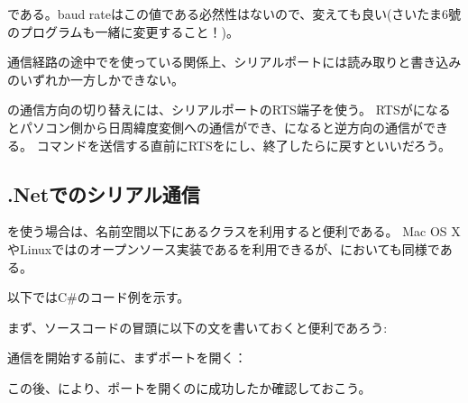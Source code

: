 \documentclass[letterpaper,10pt,dvipdfmx]{sphinxmanual}
\begin{document}
である。baud rateはこの値である必然性はないので、変えても良い(さいたま6號のプログラムも一緒に変更すること！)。

通信経路の途中でを使っている関係上、シリアルポートには読み取りと書き込みのいずれか一方しかできない。

の通信方向の切り替えには、シリアルポートのRTS端子を使う。
RTSがになるとパソコン側から日周緯度変側への通信ができ、になると逆方向の通信ができる。
コマンドを送信する直前にRTSをにし、終了したらに戻すといいだろう。


\subsection{.Netでのシリアル通信}
\label{\detokenize{nissyu-idohen/pc-software:net}}
を使う場合は、名前空間以下にあるクラスを利用すると便利である。
Mac OS XやLinuxではのオープンソース実装であるを利用できるが、においても同様である。

以下ではC\#のコード例を示す。

まず、ソースコードの冒頭に以下の文を書いておくと便利であろう:

\begin{sphinxVerbatim}[commandchars=\\\{\}]
 
\end{sphinxVerbatim}

通信を開始する前に、まずポートを開く：

\begin{sphinxVerbatim}[commandchars=\\\{\}]
    
\end{sphinxVerbatim}

この後、により、ポートを開くのに成功したか確認しておこう。
\end{document}
